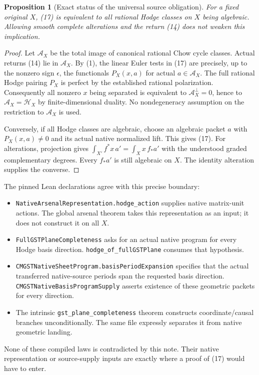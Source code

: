 \documentclass[11pt]{article}
\newtheorem{proposition}[theorem]{Proposition}
\begin{document}
\begin{proposition}[Exact status of the universal source obligation]
For a fixed original $X$, (17) is equivalent to all rational
Hodge classes on $X$ being algebraic. Allowing smooth complete
alterations and the return (14) does not weaken this implication.
\end{proposition}
\begin{proof}
Let $\mathcal A_X$ be the total image of canonical rational Chow
cycle classes. Actual returns (14) lie in $\mathcal A_X$.
By (1), the linear Euler tests in (17) are precisely, up to
the nonzero sign $\epsilon$, the functionals $P_X(x,a)$ for
actual $a\in\mathcal A_X$. The full rational Hodge pairing
$P_X$ is perfect by the established rational polarization.
Consequently all nonzero $x$ being separated is equivalent to
$\mathcal A_X^\perp=0$, hence to $\mathcal A_X=\mathcal H_X$
by finite-dimensional duality. No nondegeneracy assumption
on the restriction to $\mathcal A_X$ is used.

Conversely, if all Hodge classes are algebraic, choose an
algebraic packet $a$ with $P_X(x,a)\ne0$ and its actual native
normalized lift. This gives (17).
For alterations, projection gives
$\int_{X'}f^*x\,a'=\int_Xx\,f_*a'$ with the understood graded
complementary degrees. Every $f_*a'$ is still algebraic on $X$.
The identity alteration supplies the converse.
\end{proof}

The pinned Lean declarations agree with this precise boundary:
\begin{itemize}
\item \texttt{NativeArsenalRepresentation.hodge\_action} supplies
native matrix-unit actions. The global arsenal theorem takes
this representation as an input; it does not construct it on all $X$.
\item \texttt{FullGSTPlaneCompleteness} asks for an actual native
program for every Hodge basis direction.
\texttt{hodge\_of\_fullGSTPlane} consumes that hypothesis.
\item \texttt{CMGSTNativeSheetProgram.basisPeriodExpansion}
specifies that the actual transferred native-source periods span
the requested basis direction.
\texttt{CMGSTNativeBasisProgramSupply} asserts existence of
these geometric packets for every direction.
\item The intrinsic \texttt{gst\_plane\_completeness} theorem
constructs coordinate/causal branches unconditionally.
The same file expressly separates it from native geometric landing.
\end{itemize}
None of these compiled laws is contradicted by this note.
Their native representation or source-supply inputs are exactly
where a proof of (17) would have to enter.
\end{document}
